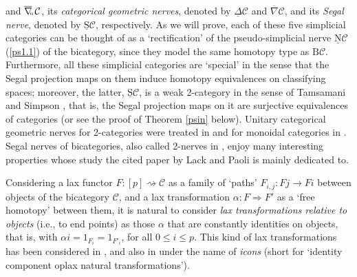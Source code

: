 \documentclass[]{amsart}
\begin{document}
and $\overline{\nabla}\hspace{-2.5pt}_{^{_\mathrm{u}}}{\ensuremath{\mathcal{C}}}$,  its {\em categorical geometric nerves},
denoted by ${\ensuremath{\underline{\Delta}}}{\ensuremath{\mathcal{C}}}$ and $\overline{\nabla}{\ensuremath{\mathcal{C}}}$, and its {\em Segal nerve}, denoted by
$\underline{\mathrm{S}}{\ensuremath{\mathcal{C}}}$, respectively. As we will prove,  each of these five simplicial
categories can be thought of as a `rectification' of the pseudo-simplicial nerve ${\ensuremath{\underline{\mathrm{N}}}}{\ensuremath{\mathcal{C}}}$
(\ref{ps1.1}) of the bicategory, since they model the same homotopy type as ${\ensuremath{\mathrm{B}}}{\ensuremath{\mathcal{C}}}$.
Furthermore, all these simplicial categories are `special' in the sense \cite{segal74, thomason}
that the Segal projection maps on them induce homotopy equivalences on classifying spaces;
moreover, the latter, $\underline{\mathrm{S}}{\ensuremath{\mathcal{C}}}$, is a weak 2-category in the sense of Tamsamani
\cite{tam} and Simpson \cite{sim}, that is, the Segal projection maps on it are surjective
equivalences of categories \cite{lack-paoli} (or see the proof of Theorem \ref{psin} below).
Unitary categorical geometric nerves for 2-categories were treated in \cite{b-c} and for monoidal
categories in \cite{b-c2}.  Segal nerves of bicategories, also called 2-nerves in
\cite{lack-paoli},  enjoy many interesting properties whose study the cited paper by Lack and Paoli
is mainly dedicated to.

Considering a lax functor $F:[p]\rightsquigarrow {\ensuremath{\mathcal{C}}}$ as a family of `paths'  $F_{i,j}:Fj\to Fi$
between objects of the bicategory ${\ensuremath{\mathcal{C}}}$, and a lax transformation $\alpha:F\Rightarrow F'$ as a
`free homotopy'  between them, it is natural to consider {\em lax transformations relative to
objects} (i.e., to end points) as those $\alpha$ that are constantly identities on objects, that
is, with $\alpha i=1_{F_i}=1_{F'_i}$, for all $0\leq i\leq p$.  This kind of lax transformations
has been considered in \cite{b-c}, and also in \cite{lack, lack-paoli, g-g} under the name of {\em
icons} (short for `identity component oplax natural transformations').
\end{document}
